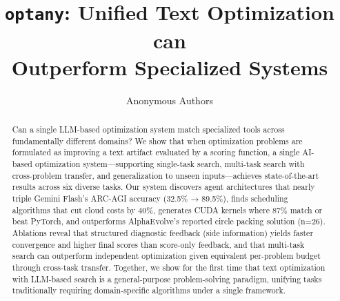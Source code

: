 \documentclass[sigconf,anonymous,review]{acmart}
\begin{document}
\title{\texttt{optany}: Unified Text Optimization can\\Outperform Specialized Systems}

\author{Anonymous Authors}




% 
\begin{abstract}
Can a single LLM-based optimization system match specialized tools across fundamentally different domains? We show that when optimization problems are formulated as improving a text artifact evaluated by a scoring function, a single AI-based optimization system---supporting single-task search, multi-task search with cross-problem transfer, and generalization to unseen inputs---achieves state-of-the-art results across six diverse tasks. Our system discovers agent architectures that nearly triple Gemini Flash's ARC-AGI accuracy (32.5\% → 89.5\%), finds scheduling algorithms that cut cloud costs by 40\%, generates CUDA kernels where 87\% match or beat PyTorch, and outperforms AlphaEvolve's reported circle packing solution (n=26). Ablations reveal that structured diagnostic feedback (side information) yields faster convergence and higher final scores than score-only feedback, and that multi-task search can outperform independent optimization given equivalent per-problem budget through cross-task transfer.
Together, we show for the first time that text optimization with LLM-based search is a general-purpose problem-solving paradigm, unifying tasks traditionally requiring domain-specific algorithms under a single framework.
\end{abstract}
\end{document}
